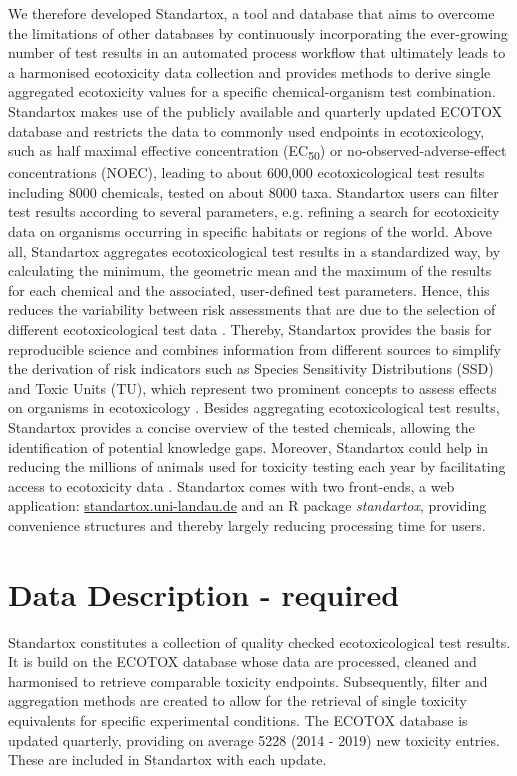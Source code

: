 \documentclass[journal,datadescriptor,accept,moreauthors,pdftex]{Definitions/mdpi}
\begin{document}
We therefore developed Standartox, a tool and database that aims to overcome the limitations of other databases by continuously incorporating the ever-growing number of test results in an automated process workflow that ultimately leads to a harmonised ecotoxicity data collection and provides methods to derive single aggregated ecotoxicity values for a specific chemical-organism test combination. Standartox makes use of the publicly available and quarterly updated ECOTOX database \citep{usepa_ecotox_2019} and restricts the data to commonly used endpoints in ecotoxicology, such as half maximal effective concentration (EC\textsubscript{50}) or no-observed-adverse-effect concentrations (NOEC), leading to about 600,000 ecotoxicological test results including 8000 chemicals, tested on about 8000 taxa. Standartox users can filter test results according to several parameters, e.g. refining a search for ecotoxicity data on organisms occurring in specific habitats or regions of the world. Above all, Standartox aggregates ecotoxicological test results in a standardized way, by calculating the minimum, the geometric mean and the maximum of the results for each chemical and the associated, user-defined test parameters. Hence, this reduces the variability between risk assessments that are due to the selection of different ecotoxicological test data \citep{mark_analysis_1998}. Thereby, Standartox provides the basis for reproducible science and combines information from different sources to simplify the derivation of risk indicators such as Species Sensitivity Distributions (SSD) and Toxic Units (TU), which represent two prominent concepts to assess effects on organisms in ecotoxicology \citep{posthuma_species_2002, kefford_definition_2011, schafer_effects_2011}. Besides aggregating ecotoxicological test results, Standartox provides a concise overview of the tested chemicals, allowing the identification of potential knowledge gaps. Moreover, Standartox could help in reducing the millions of animals used for toxicity testing each year by facilitating access to ecotoxicity data \citep{hartung_chemical_2009}. Standartox comes with two front-ends, a web application: \url{standartox.uni-landau.de} and an R \citep{rcoreteam_language_2017} package \textit{standartox}, providing convenience structures and thereby largely reducing processing time for users.

\section{Data Description - required}
Standartox constitutes a collection of quality checked ecotoxicological test results. It is build on the ECOTOX database \citep{usepa_ecotox_2019} whose data are processed, cleaned and harmonised to retrieve comparable toxicity endpoints. Subsequently, filter and aggregation methods are created to allow for the retrieval of single toxicity equivalents for specific experimental conditions. The ECOTOX database is updated quarterly, providing on average 5228 (2014 - 2019) new toxicity entries. These are included in Standartox with each update.
\end{document}
